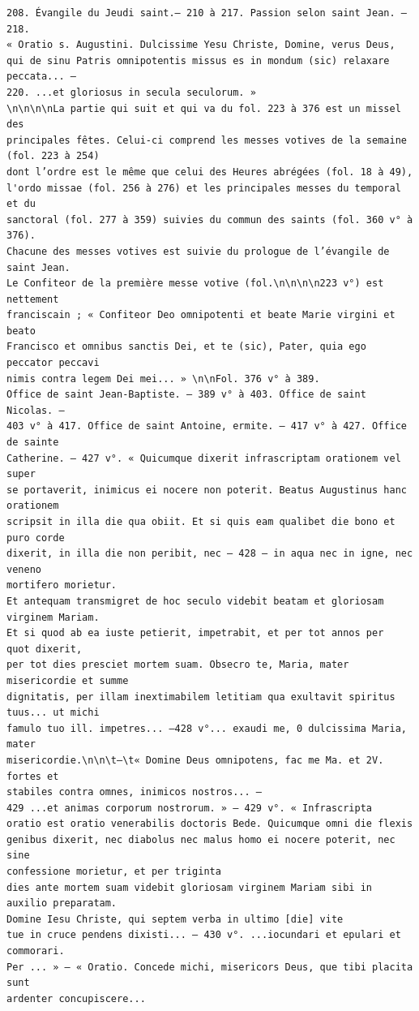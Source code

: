 \documentclass[a4paper,12pt,twoside]{book}
\begin{document}
\begin{verbatim}
208. Évangile du Jeudi saint.— 210 à 217. Passion selon saint Jean. — 218. 
« Oratio s. Augustini. Dulcissime Yesu Christe, Domine, verus Deus, 
qui de sinu Patris omnipotentis missus es in mondum (sic) relaxare peccata... — 
220. ...et gloriosus in secula seculorum. »
\n\n\n\nLa partie qui suit et qui va du fol. 223 à 376 est un missel des 
principales fêtes. Celui-ci comprend les messes votives de la semaine 
(fol. 223 à 254) 
dont l’ordre est le même que celui des Heures abrégées (fol. 18 à 49), 
l'ordo missae (fol. 256 à 276) et les principales messes du temporal et du
sanctoral (fol. 277 à 359) suivies du commun des saints (fol. 360 v° à 376).
Chacune des messes votives est suivie du prologue de l’évangile de saint Jean. 
Le Confiteor de la première messe votive (fol.\n\n\n\n223 v°) est nettement
franciscain ; « Confiteor Deo omnipotenti et beate Marie virgini et beato 
Francisco et omnibus sanctis Dei, et te (sic), Pater, quia ego peccator peccavi 
nimis contra legem Dei mei... » \n\nFol. 376 v° à 389.
Office de saint Jean-Baptiste. — 389 v° à 403. Office de saint Nicolas. —
403 v° à 417. Office de saint Antoine, ermite. — 417 v° à 427. Office de sainte
Catherine. — 427 v°. « Quicumque dixerit infrascriptam orationem vel super
se portaverit, inimicus ei nocere non poterit. Beatus Augustinus hanc orationem 
scripsit in illa die qua obiit. Et si quis eam qualibet die bono et puro corde 
dixerit, in illa die non peribit, nec — 428 — in aqua nec in igne, nec veneno 
mortifero morietur. 
Et antequam transmigret de hoc seculo videbit beatam et gloriosam virginem Mariam. 
Et si quod ab ea iuste petierit, impetrabit, et per tot annos per  quot dixerit,
per tot dies presciet mortem suam. Obsecro te, Maria, mater misericordie et summe
dignitatis, per illam inextimabilem letitiam qua exultavit spiritus tuus... ut michi
famulo tuo ill. impetres... —428 v°... exaudi me, 0 dulcissima Maria, mater 
misericordie.\n\n\t—\t« Domine Deus omnipotens, fac me Ma. et 2V. fortes et
stabiles contra omnes, inimicos nostros... — 
429 ...et animas corporum nostrorum. » — 429 v°. « Infrascripta 
oratio est oratio venerabilis doctoris Bede. Quicumque omni die flexis 
genibus dixerit, nec diabolus nec malus homo ei nocere poterit, nec sine 
confessione morietur, et per triginta 
dies ante mortem suam videbit gloriosam virginem Mariam sibi in auxilio preparatam. 
Domine Iesu Christe, qui septem verba in ultimo [die] vite 
tue in cruce pendens dixisti... — 430 v°. ...iocundari et epulari et commorari.
Per ... » — « Oratio. Concede michi, misericors Deus, que tibi placita sunt 
ardenter concupiscere...

\end{verbatim}
\end{document}
